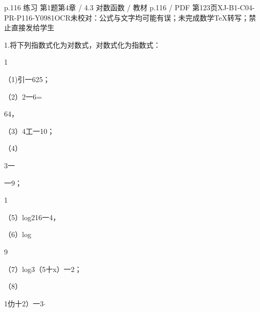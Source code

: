 \begin{bankitem}{p.116 练习 第1题}{第4章 / 4.3 对数函数 / 教材 p.116 / PDF 第123页}{XJ-B1-C04-PR-P116-Y0981}{OCR未校对：公式与文字均可能有误；未完成数学TeX转写；禁止直接发给学生}
\begin{ocrdraft}
\par
1.将下列指数式化为对数式，对数式化为指数式：
\par
1
\par
（1)引一625；
\par
（2）2一6=
\par
64，
\par
（3）4工一10；
\par
（4）
\par
3一
\par
一9；
\par
1
\par
（5）log216一4，
\par
（6）log
\par
9
\par
（7）log3（5十x）一2；
\par
（8）
\par
1仂十2）一3\ensuremath{\cdot}
\end{ocrdraft}
\end{bankitem}
